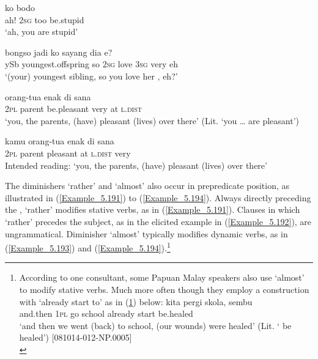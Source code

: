 \ea
\label{Example_5.187}
 {ko} {} {bodo}\\ %
 ah!  \textsc{2sg}  too  be.stupid\\
\glt 
‘ah, you are  stupid’ \textstyleExampleSource{[080917-003a-CvEx.0009]}
\z

\ea
\label{Example_5.188}
 {bongso} {jadi} {ko} {sayang} {dia} {} {e?}\\ %
 ySb  youngest.offspring  so  \textsc{2sg}  love  \textsc{3sg}  very  eh\\
\glt 
‘(your) youngest sibling, so you love her , eh?’ \textstyleExampleSource{[080922-001a-CvPh.0302]}
\z

\ea
\label{Example_5.189}
 {orang-tua} {enak} {} {di} {sana}\\ %
 \textsc{2pl}  parent  be.pleasant  very  at  \textsc{l.dist}\\
\glt 
‘you, the parents, (have)  pleasant (lives) over there’ (Lit. ‘you {\ldots} are  pleasant’) \textstyleExampleSource{[081115-001a-Cv.0106]}
\z

\ea
\label{Example_5.190}
\gll {*} {kamu} {orang-tua} {enak} {di} {sana} {}\\ %
  { }  \textsc{2pl}  parent  pleasant  at  \textsc{l.dist}  very\\
\glt 
Intended reading: ‘you, the parents, (have)  pleasant (lives) over there’ \textstyleExampleSource{[Elicited MY131113.004]}
\z


The diminishers  ‘rather’ and  ‘almost’ also occur in prepredicate position, as illustrated in (\ref{Example_5.191}) to (\ref{Example_5.194}). Always directly preceding the ,  ‘rather’ modifies stative verbs, as in (\ref{Example_5.191}). Clauses in which  ‘rather’ precedes the subject, as in the elicited example in (\ref{Example_5.192}), are ungrammatical. Diminisher  ‘almost’ typically modifies dynamic verbs, as in (\ref{Example_5.193}) and (\ref{Example_5.194}).\footnote{According to one consultant, some Papuan Malay speakers also use  ‘almost’ to modify stative verbs. Much more often though they employ a construction with  ‘already start to’ as in (\ref{Footnote_Example_5.1}) below:
\vspace{-5pt}
\ea
\label{Footnote_Example_5.1}
 {kita} {pergi} {skola,}   {sembu}\\
 {and.then} \textsc{1pl} {go} {school} {already} {start} {be.healed} \\
 ‘and then we went (back) to school, (our wounds) were   healed’ (Lit. ‘ be healed’) [081014-012-NP.0005]\\
\z
}

